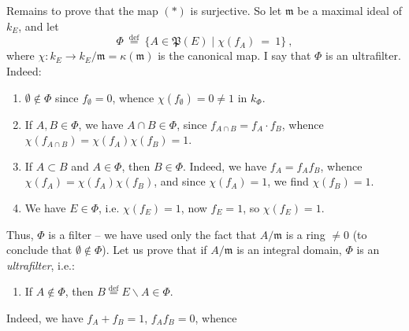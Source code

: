 \documentclass[11pt]{article}
\newcommand{\msp}[1]{\marginpar{\footnotesize [#1]}}
\newcommand{\defeq}{\overset{\text{def}}{=}}
\begin{document}
\msp{page 6}
\noindent Remains to prove that the map $(*)$ is surjective. So let $\mathfrak{m}$ be a maximal ideal of $k_E$, and let
\[
\Phi \ \defeq \ \{A\in\mathfrak{P}(E)\mid\chi(f_A) \ = \ 1\} \ ,
\]
where $\chi : k_E\longrightarrow k_E/\mathfrak{m}=\kappa(\mathfrak{m})$ is the canonical map. I say that $\Phi$ is an ultrafilter. Indeed:
\begin{enumerate}
\item[a)] $\emptyset\notin\Phi$ since $f_\emptyset=0$, whence $\chi(f_\emptyset)=0\neq1$ in $k_\Phi$.
\item[b)] If $A,B\in\Phi$, we have $A\cap B\in\Phi$, since $f_{A\cap B}=f_A\cdot f_B$, whence $\chi(f_{A\cap B})=\chi(f_A)\chi(f_B)=1$.
\item[c)] If $A\subset B$ and $A\in\Phi$, then $B\in\Phi$. Indeed, we have $f_A=f_Af_B$, whence $\chi(f_A)=\chi(f_A)\chi(f_B)$, and since $\chi(f_A)=1$, we find $\chi(f_B)=1$.
\item[d)] We have $E\in\Phi$, i.e. $\chi(f_E)=1$, now $f_E=1$, so $\chi(f_E)=1$.
\end{enumerate}
Thus, $\Phi$ is a filter -- we have used only the fact that $A/\mathfrak{m}$ is a ring $\neq0$ (to conclude that $\emptyset\notin\Phi$). Let us prove that if $A/\mathfrak{m}$ is an integral domain, $\Phi$ is an \textit{ultrafilter}, i.e.:
\begin{enumerate}
\item[e)] If $A\notin\Phi$, then $B\defeq E\backslash A\in\Phi$.
\end{enumerate}
Indeed, we have $f_A+f_B=1$, $f_Af_B=0$, whence
\end{document}
